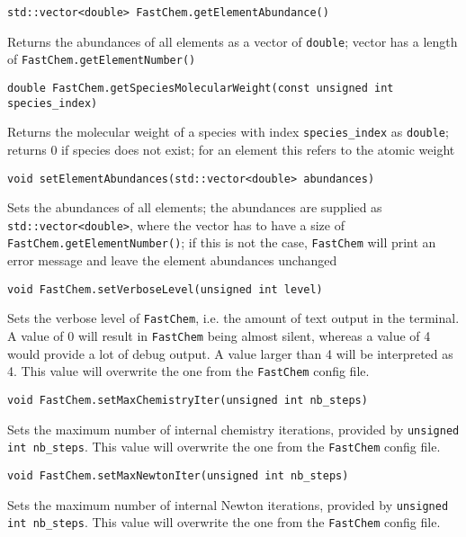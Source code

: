 \documentclass[numbers=noenddot]{aux/fcmanual}
\newcommand{\fc}{\texttt{FastChem}\xspace}
\begin{document}
\bigbreak

\lstinline!std::vector<double> FastChem.getElementAbundance()!
\begin{addmargin}[25pt]{0pt}
  Returns the abundances of all elements as a vector of \lstinline!double!; vector has a length of \lstinline!FastChem.getElementNumber()!
\end{addmargin}


\bigbreak

\lstinline!double FastChem.getSpeciesMolecularWeight(const unsigned int species_index)!
\begin{addmargin}[25pt]{0pt}
  Returns the molecular weight of a species with index \lstinline!species_index! as \lstinline!double!; returns 0 if species does not exist; for an element this refers to the atomic weight
\end{addmargin}


\bigbreak

\lstinline!void setElementAbundances(std::vector<double> abundances)!
\begin{addmargin}[25pt]{0pt}
  Sets the abundances of all elements; the abundances are supplied as \lstinline!std::vector<double>!, where the vector has to have a size of \lstinline!FastChem.getElementNumber()!; if this is not the case, \fc will print an error message and leave the element abundances unchanged
\end{addmargin}

\bigbreak

\lstinline!void FastChem.setVerboseLevel(unsigned int level)!
\begin{addmargin}[25pt]{0pt}
  Sets the verbose level of \fc, i.e. the amount of text output in the terminal. A value of 0 will result in \fc being almost silent, whereas a value of 4 would provide a lot of debug output. A value larger than 4 will be interpreted as 4. This value will overwrite the one from the \fc config file.
\end{addmargin}

\bigbreak

\lstinline!void FastChem.setMaxChemistryIter(unsigned int nb_steps)!
\begin{addmargin}[25pt]{0pt}
  Sets the maximum number of internal chemistry iterations, provided by \lstinline!unsigned int nb_steps!. This value will overwrite the one from the \fc config file.
\end{addmargin}

\bigbreak

\lstinline!void FastChem.setMaxNewtonIter(unsigned int nb_steps)!
\begin{addmargin}[25pt]{0pt}
  Sets the maximum number of internal Newton iterations, provided by \lstinline!unsigned int nb_steps!. This value will overwrite the one from the \fc config file.
\end{addmargin}
\end{document}
